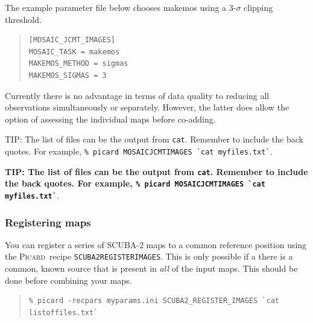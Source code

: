 \documentclass[twoside,11pt]{article}
\newenvironment{latexonly}{}{}
\newcommand{\xref}[3]{#1}
\renewcommand{\_}{\texttt{\symbol{95}}}
\newenvironment{fmpage}[1]{\begin{lrbox}{\fmbox}\begin{minipage}{#1}}{\end{minipage}\end{lrbox}\fbox{\usebox{\fmbox}}}
\newenvironment{myquote}{
   \color{MidnightBlue}\begin{quote}\begin{small}}{
   \end{small}\end{quote}
}
\newcommand{\picard}{\xref{\textsc{Picard}}{sun265}{}}
\newcommand{\drrecipe}[1]{\texttt{#1}}
\newcommand{\task}[1]{\textsf{#1}}
\newcommand{\file}[1]{\texttt{#1}}
\renewenvironment{myquote}{
      \begin{quote}\begin{small}}{
      \end{small}\end{quote}
   }
\begin{document}
The example parameter file below chooses \task{makemos} using a 3-$\sigma$
clipping threshold.

\begin{quote}
\begin{verbatim}
[MOSAIC_JCMT_IMAGES]
MOSAIC_TASK = makemos
MAKEMOS_METHOD = sigmas
MAKEMOS_SIGMAS = 3
\end{verbatim}
\end{quote}

Currently there is no advantage in terms of data quality to reducing
all observations simultaneously or separately. However, the latter
does allow the option of assessing the individual maps before co-adding.

\begin{latexonly}
\begin{center}
\begin{fmpage}{0.95\linewidth}
\vspace{0.1cm}

TIP: The list of files can be the output from \texttt{cat}. Remember to include
the back quotes.
\newline For example, \texttt{\% picard MOSAIC\_JCMT\_IMAGES \`{}cat myfiles.txt\`{}}.
\vspace{0.1cm}
\end{fmpage}
\end{center}
\end{latexonly}

\begin{htmlonly}
\textbf{TIP: The list of files can be the output from \file{cat}. Remember to
include the back quotes. For example,
\texttt{\% picard MOSAIC\_JCMT\_IMAGES \`{}cat myfiles.txt\`{}}}.
\end{htmlonly}

\subsubsection{Registering maps}

You can register a series of SCUBA-2 maps to a common reference
position using the \picard\ recipe
\xref{\drrecipe{SCUBA2\_REGISTER\_IMAGES}}{sun265}{SCUBA2\_REGISTER\_IMAGES}.
This is only possible if a there is a common, known source that is
present in \textit{all} of the input maps. This should be done before
combining your maps.
\begin{myquote}
\begin{verbatim}
% picard -recpars myparams.ini SCUBA2_REGISTER_IMAGES `cat listoffiles.txt`
\end{verbatim}
\end{myquote}
\end{document}
